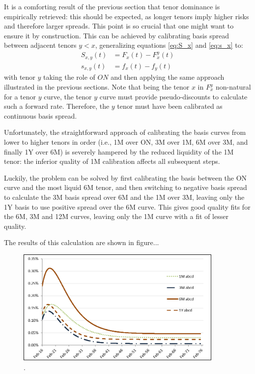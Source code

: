 \documentclass{article}
\begin{document}
It is a comforting result of the previous section that tenor dominance is empirically retrieved: this should be expected, as longer tenors imply higher risks and therefore larger spreads. This point is so crucial that one might want to ensure it by construction. This can be achieved by calibrating basis spread between adjacent tenors $y<x$, generalizing equations \ref{eq:S_x} and \ref{eq:s_x} to:
\begin{equation}
\begin{split}
S_{x,y}(t) &= F_x(t) - F_x^{y}(t)\\
s_{x,y}(t) &= f_x(t) - f_{y}(t)
\end{split}
\end{equation}
with tenor $y$ taking the role of $ON$ and then applying the same approach illustrated in the previous sections.
Note that being the tenor $x$ in $F_x^{y}$ non-natural for a tenor $y$ curve, the tenor $y$ curve must provide pseudo-discounts to calculate such a forward rate. Therefore, the $y$ tenor must have been calibrated as continuous basis spread.

Unfortunately, the straightforward approach of calibrating the basis curves from lower to higher tenors in order (i.e., 1M over ON, 3M over 1M, 6M over 3M, and finally 1Y over 6M) is severely hampered by the reduced liquidity of the 1M tenor: the inferior quality of 1M calibration affects all subsequent steps.

Luckily, the problem can be solved by first calibrating the basis between the ON curve and the most liquid 6M tenor, and then switching to negative basis spread to calculate the 3M basis spread over 6M and the 1M over 3M, leaving only the 1Y basis to use positive spread over the 6M curve.  This gives good quality fits for the 6M, 3M and 12M curves, leaving only the 1M curve with a fit of lesser quality.

The results of this calculation are shown in figure...

\begin{figure}[t]
\centering
\includegraphics[width=0.9\textwidth]{TenorDominanceContinuousBasis.png}
\caption{.}
\label{TenorDominanceContinuousBasis}
\end{figure}
\end{document}
